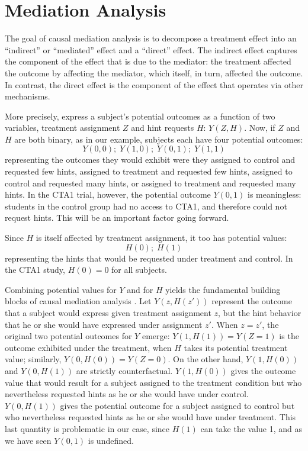 \documentclass{article}
\begin{document}
\section{Mediation Analysis}\label{sec:mediation}
The goal of causal mediation analysis is to decompose a treatment
effect into an ``indirect'' or ``mediated''
effect and a ``direct'' effect.
The indirect effect captures the component of the effect that is due
to the mediator: the treatment affected the outcome by affecting the
mediator, which itself, in turn, affected the outcome.
In contrast, the direct effect is the component of the effect that
operates via other mechanisms.

More precisely, express a subject's potential outcomes as a function
of two variables, treatment assignment $Z$ and hint requests $H$:
$Y(Z,H)$.
Now, if $Z$ and $H$ are both binary, as in our example, subjects
each have four potential outcomes:
\begin{equation*}
Y(0,0);\;Y(1,0);\;Y(0,1);\;Y(1,1)
\end{equation*}
representing the outcomes they would exhibit were they assigned to
control and requested few hints, assigned to
treatment and requested few hints, assigned to control and requested
many hints, or assigned to treatment and requested many hints.
In the CTA1 trial, however, the potential outcome $Y(0,1)$ is
meaningless: students in the control group had no access to CTA1, and
therefore could not request hints.
This will be an important factor going forward.

Since $H$ is itself affected by treatment assignment, it
too has potential values:
\begin{equation*}
H(0);\;H(1)
\end{equation*}
representing the hints that would be requested under treatment and
control.
In the CTA1 study, $H(0)=0$ for all subjects.

Combining potential values for $Y$ and for $H$ yields the fundamental
building blocks of causal mediation analysis
\citep[e.g.][]{vanderweele2015explanation,sales2017mediation}.
Let $Y(z,H(z'))$
represent the outcome that a subject would express given treatment
assignment $z$, but the hint behavior that he or she would have
expressed under assignment $z'$.
When $z=z'$, the original two potential outcomes for $Y$ emerge:
$Y(1,H(1))=Y(Z=1)$ is the outcome exhibited under the treatment, when $H$
takes its potential treatment value; similarly, $Y(0,H(0))=Y(Z=0)$. On
the other hand, $Y(1,H(0))$ and $Y(0,H(1))$ are strictly
counterfactual. $Y(1,H(0))$ gives the outcome value
that would result for a subject assigned to the treatment condition
but who nevertheless requested hints as he or she would have under
control. $Y(0,H(1))$ gives the potential outcome for a subject
assigned to control but who nevertheless requested hints as he or she
would have under treatment.
This last quantity is problematic in our case, since $H(1)$ can take the value 1,
and as we have seen $Y(0,1)$ is undefined.
\end{document}

